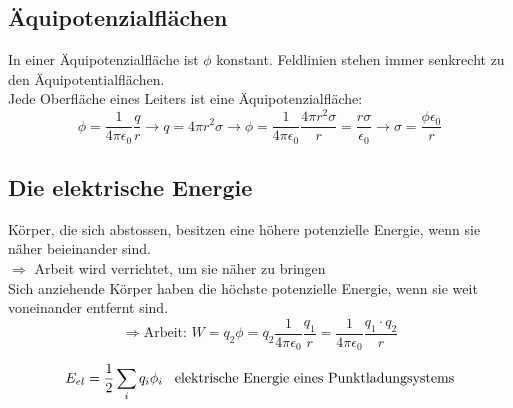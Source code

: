 \subsection{Äquipotenzialflächen}
In einer Äquipotenzialfläche ist $\phi$ konstant. Feldlinien stehen immer senkrecht zu den Äquipotentialflächen.\\[1ex]
Jede Oberfläche eines Leiters ist eine Äquipotenzialfläche:
\[
    \phi = \frac{1}{4 \pi \epsilon_0}\frac{q}{r} \rightarrow q = 4 \pi r^2 \sigma \rightarrow \phi = \frac{1}{4 \pi \epsilon_0}\frac{4 \pi r^2 \sigma}{r} = \frac{r \sigma}{\epsilon_0} \rightarrow \sigma = \frac{\phi \epsilon_0}{r}
\]

\subsection{Die elektrische Energie}
Körper, die sich abstossen, besitzen eine höhere potenzielle Energie, wenn sie näher beieinander sind. \\[1ex]
$\Rightarrow$ Arbeit wird verrichtet, um sie näher zu bringen \\[1ex]
Sich anziehende Körper haben die höchste potenzielle Energie, wenn sie weit voneinander entfernt sind.
\[
    \Rightarrow \text{Arbeit: } W = q_2 \phi = q_2 \frac{1}{4 \pi \epsilon_0}\frac{q_1}{r} = \frac{1}{4 \pi \epsilon_0}\frac{q_1 \cdot q_2}{r}
\]
\begin{formulabox}
    \[
     E_{el} = \frac{1}{2} \sum_i q_i \phi_i \hspace{3mm} \text{elektrische Energie eines Punktladungsystems}
    \]
\end{formulabox}